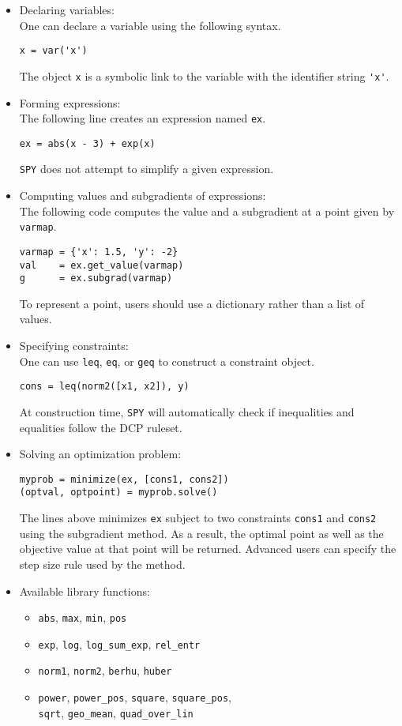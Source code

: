 \begin{itemize}
\item Declaring variables: \\
One can declare a variable using the following syntax.
\begin{verbatim}
x = var('x')
\end{verbatim}
The object \verb'x' is a symbolic link to the variable with the identifier string \verb,'x',.
\item Forming expressions: \\
The following line creates an expression named \verb'ex'.
\begin{verbatim}
ex = abs(x - 3) + exp(x)
\end{verbatim}
\verb'SPY' does not attempt to simplify a given expression.
\item Computing values and subgradients of expressions: \\
The following code computes the value and a subgradient at a point given by \verb'varmap'.
\begin{verbatim}
varmap = {'x': 1.5, 'y': -2}
val    = ex.get_value(varmap)
g      = ex.subgrad(varmap)
\end{verbatim}
To represent a point, users should use a dictionary rather than a list of values.
\item Specifying constraints: \\
One can use \verb'leq', \verb'eq', or \verb'geq' to construct a constraint object.
\begin{verbatim}
cons = leq(norm2([x1, x2]), y)
\end{verbatim}
At construction time, \verb'SPY' will automatically check if inequalities and equalities follow the DCP ruleset.
\item Solving an optimization problem:
\begin{verbatim}
myprob = minimize(ex, [cons1, cons2])
(optval, optpoint) = myprob.solve()
\end{verbatim}
The lines above minimizes \verb'ex' subject to two constraints \verb'cons1' and \verb'cons2' using the subgradient method. As a result, the optimal point as well as the objective value at that point will be returned. Advanced users can specify the step size rule used by the method.
\item Available library functions:
\begin{itemize}
\item \verb'abs', \verb'max', \verb'min', \verb'pos'
\item \verb'exp', \verb'log', \verb'log_sum_exp', \verb'rel_entr'
\item \verb'norm1', \verb'norm2', \verb'berhu', \verb'huber'
\item \verb'power', \verb'power_pos', \verb'square', \verb'square_pos', \\ \verb'sqrt', \verb'geo_mean', \verb'quad_over_lin'
\end{itemize}
\end{itemize}
